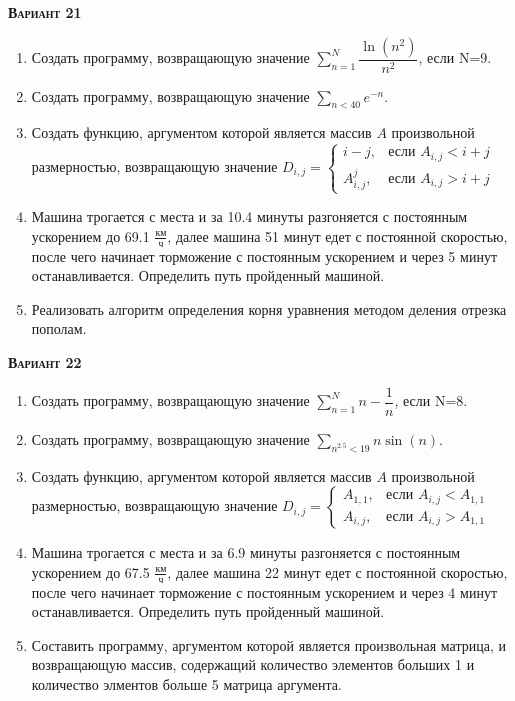 \textsc{\textbf{Вариант 21}}
\begin{enumerate}
\item  Создать программу, возвращающую значение $\sum\limits_{n=1}^{N} \dfrac{\ln(n^2)}{n^2}         $, если N=9. 
\item  Создать программу, возвращающую значение $\sum\limits_{n<        40} {e^{-n}}                      $. 
\item Создать функцию, аргументом которой является массив $A$ произвольной размерностью, возвращающую значение $D_{i,j}=\begin{cases} i-j, & \text{если } {A_{i,j}}<i+j \\  A_{i,j}^j, & \text{если } {A_{i,j}}>i+j \end{cases}                              $ 
\item Машина трогается с места и за 10.4 минуты разгоняется с постоянным ускорением до 69.1 ${\frac{км}{ч}}$, далее машина   51 минут едет с постоянной скоростью, после чего начинает торможение с постоянным ускорением и через   5 минут останавливается. Определить путь пройденный машиной.  \item Реализовать алгоритм определения корня уравнения методом деления отрезка пополам.                                                                                                                                                                                              

\end{enumerate}
\textsc{\textbf{Вариант 22}}
\begin{enumerate}
\item  Создать программу, возвращающую значение $\sum\limits_{n=1}^{N} {n -\dfrac{1}{n}}             $, если N=8. 
\item  Создать программу, возвращающую значение $\sum\limits_{n^{2.5}<  19} {n \sin(n)}                   $. 
\item Создать функцию, аргументом которой является массив $A$ произвольной размерностью, возвращающую значение $D_{i,j}=\begin{cases} A_{1,1}, & \text{если } A_{i,j}<A_{1,1} \\ A_{i,j}, & \text{если } A_{i,j}>A_{1,1} \end{cases}                         $ 
\item Машина трогается с места и за  6.9 минуты разгоняется с постоянным ускорением до 67.5 ${\frac{км}{ч}}$, далее машина   22 минут едет с постоянной скоростью, после чего начинает торможение с постоянным ускорением и через   4 минут останавливается. Определить путь пройденный машиной.  \item Составить программу, аргументом которой является произвольная матрица, и возвращающую массив, содержащий количество элементов больших 1 и количество элментов больше 5 матрица аргумента.

\end{enumerate}
